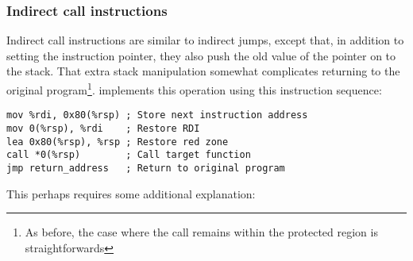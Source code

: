 

\subsubsection{Indirect call instructions}

Indirect call instructions are similar to indirect jumps, except that,
in addition to setting the instruction pointer, they also push the old
value of the pointer on to the stack.  That extra stack manipulation
somewhat complicates returning to the original program\footnote{As
  before, the case where the call remains within the protected region
  is straightforwards}.  {\Implementation} implements this operation
using this instruction sequence:

\begin{verbatim}
mov %rdi, 0x80(%rsp) ; Store next instruction address
mov 0(%rsp), %rdi    ; Restore RDI
lea 0x80(%rsp), %rsp ; Restore red zone
call *0(%rsp)        ; Call target function
jmp return_address   ; Return to original program
\end{verbatim}

This perhaps requires some additional explanation:

